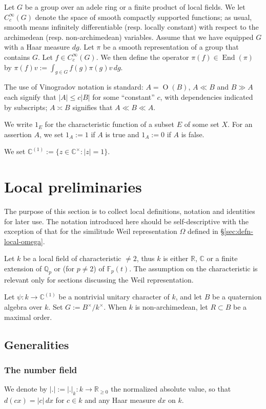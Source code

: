 \documentclass[reqno,10pt]{amsart}
\theoremstyle{plain} %
\theoremstyle{definition}
\theoremstyle{plain} %
\theoremstyle{remark}
\theoremstyle{itplain} %
\theoremstyle{remark} %
\renewcommand{\geq}{\geqslant}
\renewcommand{\leq}{\leqslant}
\numberwithin{equation}{section}
\DeclareMathOperator{\End}{End}
\def\O{\operatorname{O}}
\begin{document}
Let $G$ be a group over an adele ring or a finite product of local fields.  We let $C_c^\infty(G)$ denote the space of smooth compactly supported functions; as usual, smooth means infinitely differentiable (resp. locally constant) with respect to the archimedean (resp. non-archimedean) variables.  Assume that we have equipped $G$ with a Haar measure $d g$.  Let $\pi$ be a smooth representation of a group that contains $G$.  Let $f \in C_c^\infty(G)$.  We then define the operator $\pi(f) \in \End(\pi)$ by $\pi(f) v := \int_{g \in G} f(g) \pi(g) v \,d g$.

The use of Vinogradov notation is standard: $A = \O(B)$, $A \ll B$ and $B \gg A$ each signify that $|A| \leq c |B|$ for some ``constant'' $c$, with dependencies indicated by subscripts; $A \asymp B$ signifies that $A \ll B \ll A$.
 
We write $1_E$ for the characteristic function of a subset $E$ of some set $X$.  For an assertion $A$, we set $1_A := 1$ if $A$ is true and $1_A := 0$ if $A$ is false.

We set $\mathbb{C}^{(1)} := \{ z \in \mathbb{C}^{\times} : |z| = 1\}$.

  
\section{Local preliminaries}
\label{sec-2}
The purpose of this section is to collect local definitions, notation and identities for later use.  The notation introduced here should be self-descriptive with the exception of that for the similitude Weil representation $\Omega$ defined in \S\ref{sec:defn-local-omega}.

Let $k$ be a local field of characteristic $\neq 2$, thus $k$ is either $\mathbb{R}$, $\mathbb{C}$ or a finite extension of $\mathbb{Q}_p$ or (for $p \neq 2$) of $\mathbb{F}_p(t)$.  The assumption on the characteristic is relevant only for sections discussing the Weil representation.

Let $\psi : k \rightarrow \mathbb{C}^{(1)}$ be a nontrivial unitary character of $k$, and let $B$ be a quaternion algebra over $k$.  Set $G := B^\times/ k^\times$.  When $k$ is non-archimedean, let $R \subset B$ be a maximal order.

\subsection{Generalities}
\label{sec-2-1}
\subsubsection{The number field}
\label{sec-2-1-1}
We denote by $|.| := |.|_k : k \rightarrow \mathbb{R}_{\geq 0}$ the normalized absolute value, so that $d(c x) = |c| \, d x$ for $c \in k$ and any Haar measure $d x$ on $k$.
\end{document}
